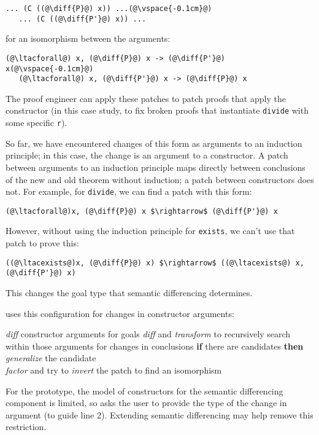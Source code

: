 \begin{lstlisting}[language=coq]
   ... (C ((@\diff{P}@) x)) ...(@\vspace{-0.1cm}@)
   ... (C ((@\diff{P'}@) x)) ...
\end{lstlisting}
for an isomorphism between the arguments:

\begin{lstlisting}[language=coq]
   (@\ltacforall@) x, (@\diff{P}@) x -> (@\diff{P'}@) x(@\vspace{-0.1cm}@)
   (@\ltacforall@) x, (@\diff{P'}@) x -> (@\diff{P}@) x
\end{lstlisting}
The proof engineer can apply these patches to patch proofs that apply the constructor (in this case study,
to fix broken proofs that instantiate \lstinline{divide} with some specific \lstinline{r}).

So far, we have encountered changes of this form as arguments to an 
induction principle; in this case, the change is an argument to a constructor.
A patch between arguments to an induction principle maps
directly between conclusions of the new and old theorem without
induction; a patch between constructors does not.
For example, for \lstinline{divide}, we can find a patch with this form:

\begin{lstlisting}[language=coq]
   (@\ltacforall@)x, (@\diff{P}@) x $\rightarrow$ (@\diff{P'}@) x
\end{lstlisting}
However, without using the induction principle for \lstinline{exists}, we can't use that patch to prove this:

\begin{lstlisting}[language=coq]
   ((@\ltacexists@)x, (@\diff{P}@) x) $\rightarrow$ ((@\ltacexists@) x, (@\diff{P'}@) x)
\end{lstlisting}
This changes the goal type that semantic differencing determines.

\sysname uses this configuration for changes in constructor arguments:

\begin{algorithm}
\footnotesize
\begin{algorithmic}[1]
    \STATE \textit{diff} constructor arguments for goals
    \STATE \textit{diff} and \textit{transform} to recursively search within those arguments for changes in conclusions
    \STATE \textbf{if} there are candidates \textbf{then}
    \STATE \hspace*{1em} \textit{generalize} the candidate \\
           \hspace*{1em} \textit{factor} and try to \textit{invert} the patch to find an isomorphism
\end{algorithmic}
\end{algorithm}
For the prototype, the model of constructors for the semantic differencing component is limited,
so \sysname asks the user to provide the type of the change in argument (to guide line 2).
Extending semantic differencing may help remove this restriction.




